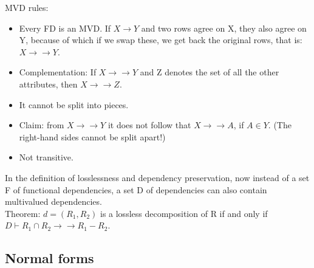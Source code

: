 \documentclass[margin=0px]{article}
\begin{document}
MVD rules:
\begin{itemize}
    \item Every FD is an MVD. If $X \to Y$ and two rows agree on X, they also agree on Y, because of which if we swap these, we get back the original rows, that is: $X \to\to Y$.
    \item Complementation: If $X \to\to Y$ and Z denotes the set of all the other attributes, then $X \to\to Z$.
    \item It cannot be split into pieces.
    \item Claim: from $X \to\to Y$ it does not follow that $X \to\to A$, if $A \in Y$. (The right-hand sides cannot be split apart!)
    \item Not transitive.
\end{itemize}
In the definition of losslessness and dependency preservation, now instead of a set F of functional dependencies, a set D of dependencies can also contain multivalued dependencies. \\
Theorem: $d=(R_1,R_2)$ is a lossless decomposition of R if and only if $D \vdash R_1 \cap R_2 \to\to R_1-R_2$.

\subsection{Normal forms}
\end{document}
